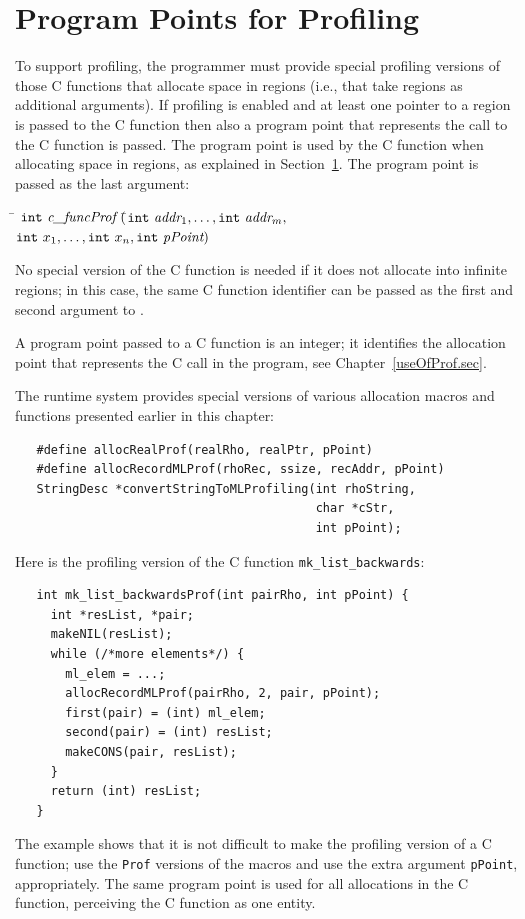 \documentclass[12pt]{book}
\begin{document}
\section{Program Points for Profiling}
\label{prof.sec}
To support profiling, the programmer must provide special profiling
versions of those C functions that allocate space in regions (i.e.,
that take regions as additional arguments). If profiling is enabled
and at least one pointer to a region is passed to the C function then
also a program point that represents the call to the C function is
passed.  The program point is used by the C function when allocating
space in regions, as explained in Section~\ref{prof.sec}. The program
point is passed as the last argument:
\begin{tabbing}
\indent\=  $\texttt{int} \ \emph{c\_funcProf} \ ($\=$\texttt{int}\ \emph{addr}_1,
    \ldots, \texttt{int}\ \emph{addr}_m,$\\
  \>\>$ \texttt{int}\ x_1, \ldots,
    \texttt{int}\ x_n, \texttt{int}\ \emph{pPoint}) $
\end{tabbing}
\noindent
No special version of the C function is needed if it does not allocate
into infinite regions; in this case, the same C function identifier can be
passed as the first and second argument to .

A program point passed to a C function is an integer; it identifies the
allocation point that represents the C call in the program, see
Chapter~\ref{useOfProf.sec}.

The runtime system provides special versions of various allocation
macros and functions presented earlier in this chapter:
%
%
%
\begin{verbatim}
   #define allocRealProf(realRho, realPtr, pPoint)
   #define allocRecordMLProf(rhoRec, ssize, recAddr, pPoint)
   StringDesc *convertStringToMLProfiling(int rhoString, 
                                          char *cStr, 
                                          int pPoint);
\end{verbatim}

Here is the profiling version of the C function
\verb|mk_list_backwards|:
\begin{verbatim}
   int mk_list_backwardsProf(int pairRho, int pPoint) {
     int *resList, *pair;
     makeNIL(resList);  
     while (/*more elements*/) {
       ml_elem = ...;
       allocRecordMLProf(pairRho, 2, pair, pPoint);
       first(pair) = (int) ml_elem;
       second(pair) = (int) resList;
       makeCONS(pair, resList);
     }
     return (int) resList;
   }
\end{verbatim}
The example shows that it is not difficult to make the profiling
version of a C function; use the \texttt{Prof} versions of the
macros and use the extra argument \texttt{pPoint}, appropriately. The
same program point is used for all allocations in the C function,
perceiving the C function as one entity.
\end{document}
